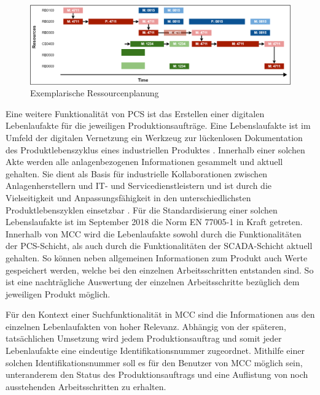 \begin{figure}[H]
    \centering
    \includegraphics[width=0.9\linewidth]{images/Ressourcenplanung.png}
    \caption{Exemplarische Ressourcenplanung \cite{EniscobyForcamGmbH.2021}\protect\footnotemark}
    \label{fig:Ressourcenplanung}
\end{figure}


Eine weitere Funktionalität von PCS ist das Erstellen einer digitalen Lebenlaufakte für die jeweiligen Produktionsaufträge. Eine Lebenslaufakte ist im Umfeld der digitalen Vernetzung ein Werkzeug zur lückenlosen Dokumentation des Produktlebenszyklus eines industriellen Produktes \cite{MaximilianAusterjost.2021}. Innerhalb einer solchen Akte werden alle anlagenbezogenen Informationen gesammelt und aktuell gehalten. Sie dient als Basis für industrielle Kollaborationen zwischen Anlagenherstellern und IT- und Servicedienstleistern und ist durch die Vielseitigkeit und Anpassungsfähigkeit in den unterschiedlichsten Produktlebenszyklen einsetzbar \cite{MaximilianAusterjost.2021}. Für die Standardisierung einer solchen Lebenslaufakte ist im September 2018 die Norm \glqq EN 77005-1\grqq{} in Kraft getreten. Innerhalb von MCC wird die Lebenlaufakte sowohl durch die Funktionalitäten der PCS-Schicht, als auch durch die Funktionalitäten der SCADA-Schicht aktuell gehalten. So können neben allgemeinen Informationen zum Produkt auch Werte gespeichert werden, welche bei den einzelnen Arbeitsschritten entstanden sind. So ist eine nachträgliche Auswertung der einzelnen Arbeitsschritte bezüglich dem jeweiligen Produkt möglich.

Für den Kontext einer Suchfunktionalität in MCC sind die Informationen aus den einzelnen Lebenlaufakten von hoher Relevanz. Abhängig von der späteren, tatsächlichen Umsetzung wird jedem Produktionsauftrag und somit jeder Lebenlaufakte eine eindeutige Identifikationsnummer zugeordnet. Mithilfe einer solchen Identifikationsnummer soll es für den Benutzer von MCC möglich sein, unteranderem den Status des Produktionsauftrags und eine Auflistung von noch ausstehenden Arbeitsschritten zu erhalten.

